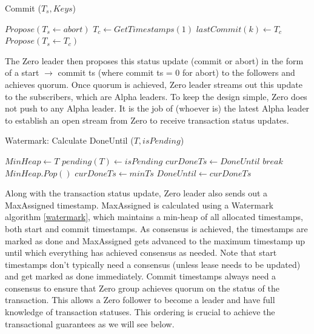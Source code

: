 \documentclass[letterpaper,twocolumn,10pt]{article}
\begin{document}
\begin{algorithm}[t]
  \caption{Commit ($T_s, Keys$)}\label{commit}
	\begin{algorithmic}[1]
    \State $Propose(T_s \gets abort)$
    \State \Return
    \EndIf
		\EndFor
    \State $T_c \gets GetTimestamps(1)$
    \State $lastCommit(k) \gets T_c$
    \EndFor
    \State $Propose(T_s \gets T_c)$
	\end{algorithmic}
\end{algorithm}


The Zero leader then proposes this status update (commit or abort) in the form
of a start $\rightarrow$ commit ts (where commit ts = 0 for abort) to the followers and
achieves quorum. Once quorum is achieved, Zero leader streams out this update to
the subscribers, which are Alpha leaders. To keep the design simple, Zero does
not push to any Alpha leader. It is the job of (whoever is) the latest Alpha
leader to establish an open stream from Zero to receive transaction status updates.

\begin{algorithm}[t]
  \caption{Watermark: Calculate DoneUntil ($T, isPending$)}\label{watermark}
	\begin{algorithmic}[1]
    \State $MinHeap \gets T$
    \EndIf
    \State $ pending(T) \gets isPending $
    \State $curDoneTs \gets DoneUntil$
    \State $break$
    \EndIf
    \State $MinHeap.Pop()$
    \State $curDoneTs \gets minTs$
		\EndFor
    \State $DoneUntil \gets curDoneTs$
	\end{algorithmic}
\end{algorithm}

Along with the transaction status update, Zero leader also sends out a
MaxAssigned timestamp. MaxAssigned is calculated using a Watermark algorithm
\ref{watermark}, which maintains a min-heap of all allocated timestamps, both
start and commit timestamps. As consensus is achieved, the timestamps are marked
as done and MaxAssigned gets advanced to the maximum timestamp up until which
everything has achieved consensus as needed. Note that start timestamps don't
typically need a consensus (unless lease needs to be updated) and get marked as
done immediately. Commit timestamps always need a consensus to ensure that Zero
group achieves quorum on the status of the transaction. This allows a Zero
follower to become a leader and have full knowledge of transaction statuses. This
ordering is crucial to achieve the transactional guarantees as we will see
below.
\end{document}
